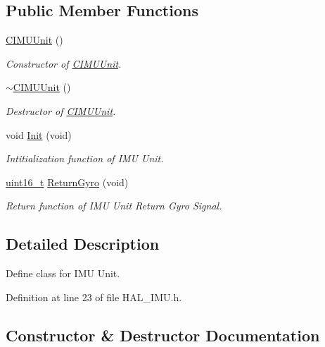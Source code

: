 \subsection*{Public Member Functions}
\begin{DoxyCompactItemize}
\item 
\mbox{\hyperlink{class_c_i_m_u_unit_a642610dac7cbec756f3ef51c5d77c344}{C\+I\+M\+U\+Unit}} ()
\begin{DoxyCompactList}\small\item\em Constructor of \mbox{\hyperlink{class_c_i_m_u_unit}{C\+I\+M\+U\+Unit}}. \end{DoxyCompactList}\item 
\mbox{\hyperlink{class_c_i_m_u_unit_ad1b0755d9d3f7f25abc660562eba6dfa}{$\sim$\+C\+I\+M\+U\+Unit}} ()
\begin{DoxyCompactList}\small\item\em Destructor of \mbox{\hyperlink{class_c_i_m_u_unit}{C\+I\+M\+U\+Unit}}. \end{DoxyCompactList}\item 
void \mbox{\hyperlink{class_c_i_m_u_unit_a589ccc2afbaadbdf9dbef34c5025a42f}{Init}} (void)
\begin{DoxyCompactList}\small\item\em Intitialization function of I\+MU Unit. \end{DoxyCompactList}\item 
\mbox{\hyperlink{_a_d_a_s___types_8h_a1f1825b69244eb3ad2c7165ddc99c956}{uint16\+\_\+t}} \mbox{\hyperlink{class_c_i_m_u_unit_a396b045fac007e169289409ca213ac39}{Return\+Gyro}} (void)
\begin{DoxyCompactList}\small\item\em Return function of I\+MU Unit Return Gyro Signal. \end{DoxyCompactList}\end{DoxyCompactItemize}


\subsection{Detailed Description}
Define class for I\+MU Unit. 

Definition at line 23 of file H\+A\+L\+\_\+\+I\+M\+U.\+h.



\subsection{Constructor \& Destructor Documentation}
\mbox{\label{class_c_i_m_u_unit_a642610dac7cbec756f3ef51c5d77c344}} 
